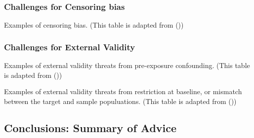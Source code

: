 \documentclass[
  singlecolumn]{article}
\begin{document}
\subsubsection{Challenges for Censoring
bias}\label{challenges-for-censoring-bias}

\begin{table}

\caption{\label{tbl-censoring}Examples of censoring bias. (This table is
adapted from ())}

\centering{

\terminologycensoring

}

\end{table}%

\subsubsection{Challenges for External
Validity}\label{challenges-for-external-validity}

\begin{table}

\caption{\label{tbl-external-validity-confounding}Examples of external
validity threats from pre-exposure confounding. (This table is adapted
from ())}

\centering{

\terminologyselectionrestrictionclassic

}

\end{table}%

\begin{table}

\caption{\label{tbl-external-validity-no-bias}Examples of external
validity threats from restriction at baseline, or mismatch between the
target and sample populuations. (This table is adapted from
())}

\centering{

\terminologyselectionrestrictionbaseline

}

\end{table}%

\subsection{Conclusions: Summary of
Advice}\label{conclusions-summary-of-advice}
\end{document}
